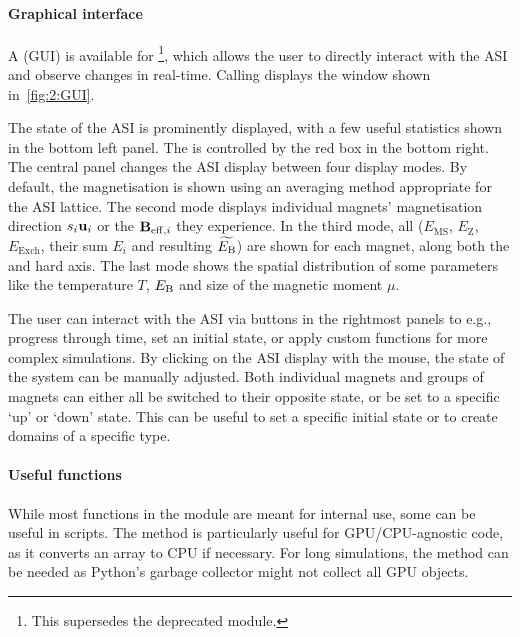\paragraph{Graphical interface}
A  (GUI) is available for \hotspice\footnote{
	This supersedes the deprecated  module.
}, which allows the user to directly interact with the ASI and observe changes in real-time.
Calling  displays the window shown in~\cref{fig:2:GUI}. \par
The state of the ASI is prominently displayed, with a few useful statistics shown in the bottom left panel.
The  is controlled by the red box in the bottom right.
The central panel changes the ASI display between four display modes.
By default, the magnetisation is shown using an averaging method appropriate for the ASI lattice.
The second mode displays individual magnets' magnetisation direction $s_i \boldsymbol{\mathbf{u}}_i$ or the  $\boldsymbol{\mathbf{B}}_{\mathrm{eff},i}$ they experience.
In the third mode, all  ($E_\mathrm{MS}$, $E_\mathrm{Z}$, $E_\mathrm{Exch}$, their sum $E_i$ and resulting $\widetilde{E_\mathrm{B}}$) are shown for each magnet, along both the  and hard axis.
The last mode shows the spatial distribution of some parameters like the temperature $T$,  $E_\mathrm{B}$ and size of the magnetic moment $\mu$. \par
The user can interact with the ASI via buttons in the rightmost panels to e.g., progress through time, set an initial state, or apply custom functions for more complex simulations.
By clicking on the ASI display with the mouse, the state of the system can be manually adjusted.
Both individual magnets and groups of magnets can either all be switched to their opposite state, or be set to a specific `up' or `down' state.
This can be useful to set a specific initial state or to create domains of a specific type.


\paragraph{Useful functions}
While most functions in the \textbf{} module are meant for internal use, some can be useful in scripts.
The  method is particularly useful for GPU/CPU-agnostic code, as it converts an array to CPU if necessary.
For long simulations, the  method can be needed as Python's garbage collector might not collect all GPU objects.
